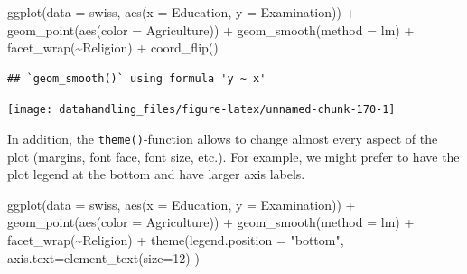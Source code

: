 \documentclass[
  12pt,
]{style/krantz}
\newenvironment{Shaded}{\begin{snugshade}}{\end{snugshade}}
\newcommand{\AttributeTok}[1]{\textcolor[rgb]{0.77,0.63,0.00}{#1}}
\newcommand{\DecValTok}[1]{\textcolor[rgb]{0.00,0.00,0.81}{#1}}
\newcommand{\FunctionTok}[1]{\textcolor[rgb]{0.00,0.00,0.00}{#1}}
\newcommand{\NormalTok}[1]{#1}
\newcommand{\SpecialCharTok}[1]{\textcolor[rgb]{0.00,0.00,0.00}{#1}}
\newcommand{\StringTok}[1]{\textcolor[rgb]{0.31,0.60,0.02}{#1}}
\begin{document}
\begin{Shaded}
\begin{Highlighting}[]
\FunctionTok{ggplot}\NormalTok{(}\AttributeTok{data =}\NormalTok{ swiss, }\FunctionTok{aes}\NormalTok{(}\AttributeTok{x =}\NormalTok{ Education, }\AttributeTok{y =}\NormalTok{ Examination)) }\SpecialCharTok{+} 
     \FunctionTok{geom\_point}\NormalTok{(}\FunctionTok{aes}\NormalTok{(}\AttributeTok{color =}\NormalTok{ Agriculture)) }\SpecialCharTok{+}
     \FunctionTok{geom\_smooth}\NormalTok{(}\AttributeTok{method =} \StringTok{\textquotesingle{}lm\textquotesingle{}}\NormalTok{) }\SpecialCharTok{+}
     \FunctionTok{facet\_wrap}\NormalTok{(}\SpecialCharTok{\textasciitilde{}}\NormalTok{Religion) }\SpecialCharTok{+}
     \FunctionTok{coord\_flip}\NormalTok{()}
\end{Highlighting}
\end{Shaded}

\begin{verbatim}
## `geom_smooth()` using formula 'y ~ x'
\end{verbatim}

\texttt{[image: datahandling\_files/figure-latex/unnamed-chunk-170-1]}

In addition, the \texttt{theme()}-function allows to change almost every aspect of the plot (margins, font face, font size, etc.). For example, we might prefer to have the plot legend at the bottom and have larger axis labels.

\begin{Shaded}
\begin{Highlighting}[]
\FunctionTok{ggplot}\NormalTok{(}\AttributeTok{data =}\NormalTok{ swiss, }\FunctionTok{aes}\NormalTok{(}\AttributeTok{x =}\NormalTok{ Education, }\AttributeTok{y =}\NormalTok{ Examination)) }\SpecialCharTok{+} 
     \FunctionTok{geom\_point}\NormalTok{(}\FunctionTok{aes}\NormalTok{(}\AttributeTok{color =}\NormalTok{ Agriculture)) }\SpecialCharTok{+}
     \FunctionTok{geom\_smooth}\NormalTok{(}\AttributeTok{method =} \StringTok{\textquotesingle{}lm\textquotesingle{}}\NormalTok{) }\SpecialCharTok{+}
     \FunctionTok{facet\_wrap}\NormalTok{(}\SpecialCharTok{\textasciitilde{}}\NormalTok{Religion) }\SpecialCharTok{+}
     \FunctionTok{theme}\NormalTok{(}\AttributeTok{legend.position =} \StringTok{"bottom"}\NormalTok{, }\AttributeTok{axis.text=}\FunctionTok{element\_text}\NormalTok{(}\AttributeTok{size=}\DecValTok{12}\NormalTok{) ) }
\end{Highlighting}
\end{Shaded}
\end{document}

